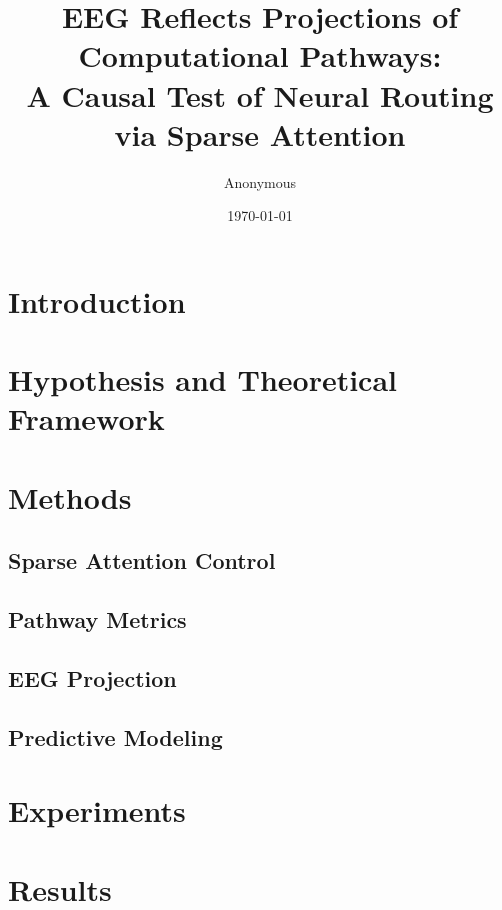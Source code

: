 \documentclass[11pt,a4paper]{article}
\title{EEG Reflects Projections of Computational Pathways: \\
       A Causal Test of Neural Routing via Sparse Attention}
\author{Anonymous}
\date{\today}
\begin{document}
\maketitle

\begin{abstract}

\end{abstract}

\section{Introduction}


\section{Hypothesis and Theoretical Framework}


\section{Methods}


\subsection{Sparse Attention Control}


\subsection{Pathway Metrics}


\subsection{EEG Projection}


\subsection{Predictive Modeling}


\section{Experiments}


\section{Results}

\end{document}
